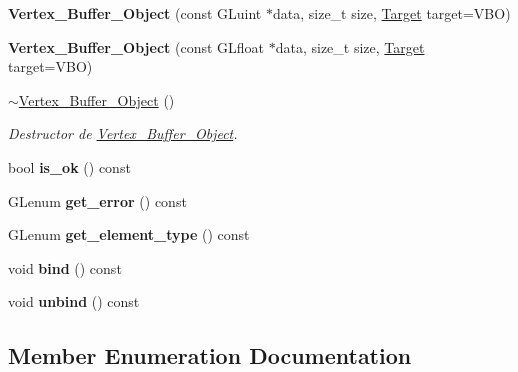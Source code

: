 \begin{DoxyCompactItemize}
{\bfseries Vertex\+\_\+\+Buffer\+\_\+\+Object} (const G\+Luint $\ast$data, size\+\_\+t size, \mbox{\hyperlink{classexample_1_1_vertex___buffer___object_a376260819cb29bd5300ce2b9885dedb7}{Target}} target=V\+BO)
\item 
\mbox{\label{classexample_1_1_vertex___buffer___object_a273b6db68a5be554912e5da6fb8ce1c1}} 
{\bfseries Vertex\+\_\+\+Buffer\+\_\+\+Object} (const G\+Lfloat $\ast$data, size\+\_\+t size, \mbox{\hyperlink{classexample_1_1_vertex___buffer___object_a376260819cb29bd5300ce2b9885dedb7}{Target}} target=V\+BO)
\item 
\mbox{\hyperlink{classexample_1_1_vertex___buffer___object_aaa8d416cc84ac665fea6b3dca3904b6d}{$\sim$\+Vertex\+\_\+\+Buffer\+\_\+\+Object}} ()
\begin{DoxyCompactList}\small\item\em Destructor de \mbox{\hyperlink{classexample_1_1_vertex___buffer___object}{Vertex\+\_\+\+Buffer\+\_\+\+Object}}. \end{DoxyCompactList}\item 
\mbox{\label{classexample_1_1_vertex___buffer___object_afa27276a8eb03e6b9f9a89ac55c28c5d}} 
bool {\bfseries is\+\_\+ok} () const
\item 
\mbox{\label{classexample_1_1_vertex___buffer___object_a51fba60b8c0ee7ab6483d8700ee70918}} 
G\+Lenum {\bfseries get\+\_\+error} () const
\item 
\mbox{\label{classexample_1_1_vertex___buffer___object_ae2adc56ce0f8d08e14467acfa65cf52a}} 
G\+Lenum {\bfseries get\+\_\+element\+\_\+type} () const
\item 
\mbox{\label{classexample_1_1_vertex___buffer___object_ab9f916966301d0f0c7e5c98533d6a14a}} 
void {\bfseries bind} () const
\item 
\mbox{\label{classexample_1_1_vertex___buffer___object_aaadc6f24df566c535db7a6851dbd7174}} 
void {\bfseries unbind} () const
\end{DoxyCompactItemize}


\subsection{Member Enumeration Documentation}
\mbox{\label{classexample_1_1_vertex___buffer___object_a376260819cb29bd5300ce2b9885dedb7}} 
